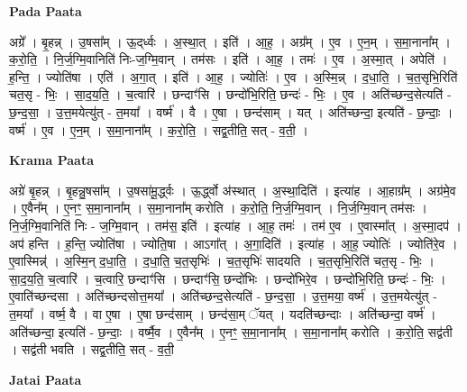 \documentclass[17pt]{extarticle}
\begin{document}
\textbf{Pada Paata} \newline

अग्रे᳚ । बृ॒हन्न् । उ॒षसा᳚म् । ऊ॒द्‌र्ध्वः । अ॒स्था॒त् । इति॑ । आ॒ह॒ । अग्र᳚म् । ए॒व । ए॒न॒म् । स॒मा॒नाना᳚म् । क॒रो॒ति॒ । नि॒र्ज॒ग्मि॒वानिति॑ निः-ज॒ग्मि॒वान् । तम॑सः । इति॑ । आ॒ह॒ । तमः॑ । ए॒व । अ॒स्मा॒त् । अपेति॑ । ह॒न्ति॒ । ज्योति॑षा । एति॑ । अ॒गा॒त् । इति॑ । आ॒ह॒ । ज्योतिः॑ । ए॒व । अ॒स्मि॒न्न् । द॒धा॒ति॒ । च॒त॒सृभि॒रिति॑ चत॒सृ - भिः॒ । सा॒द॒य॒ति॒ । च॒त्वारि॑ । छन्दाꣳ॑सि । छन्दो॑भि॒रिति॒ छन्दः॑ - भिः॒ । ए॒व । अति॑च्छन्द॒सेत्यति॑ - छ॒न्द॒सा॒ । उ॒त्त॒मयेत्यु॑त् - त॒मया᳚ । वर्ष्म॑ । वै । ए॒षा । छन्द॑साम् । यत् । अति॑च्छन्दा॒ इत्यति॑ - छ॒न्दाः॒ । वर्ष्म॑ । ए॒व । ए॒न॒म् । स॒मा॒नाना᳚म् । क॒रो॒ति॒ । सद्व॒तीति॒ सत् - व॒ती॒ ।  \newline


\textbf{Krama Paata} \newline

अग्रे॑ बृ॒हन्न् । बृ॒हन्नु॒षसा᳚म् । उ॒षसा॑मू॒र्द्ध्वः । ऊ॒र्द्ध्वो अ॑स्थात् । अ॒स्था॒दिति॑ । इत्या॑ह । आ॒हाग्र᳚म् । अग्र॑मे॒व । ए॒वैन᳚म् । 
ए॒नꣳ॒॒ स॒मा॒नाना᳚म् । स॒मा॒नाना᳚म् करोति । क॒रो॒ति॒ नि॒र्ज॒ग्मि॒वान् । नि॒र्ज॒ग्मि॒वान् तम॑सः । नि॒र्ज॒ग्मि॒वानिति॑ निः - ज॒ग्मि॒वान् । तम॑स॒ इति॑ । इत्या॑ह । आ॒ह॒ तमः॑ । तम॑ ए॒व । ए॒वास्मा᳚त् । अ॒स्मा॒दप॑ । अप॑ हन्ति । ह॒न्ति॒ ज्योति॑षा । ज्योति॒षा । आऽगा᳚त् । अ॒गा॒दिति॑ । इत्या॑ह । आ॒ह॒ ज्योतिः॑ । ज्योति॑रे॒व । ए॒वास्मिन्न्॑ । अ॒स्मि॒न् द॒धा॒ति॒ । द॒धा॒ति॒ च॒त॒सृभिः॑ । च॒त॒सृभिः॑ सादयति । च॒त॒सृभि॒रिति॑ चत॒सृ - भिः॒ । सा॒द॒य॒ति॒ च॒त्वारि॑ । च॒त्वारि॒ छन्दाꣳ॑सि । छन्दाꣳ॑सि॒ छन्दो॑भिः । छन्दो॑भिरे॒व । छन्दो॑भि॒रिति॒ छन्दः॑ - भिः॒ । ए॒वाति॑च्छन्दसा । अति॑च्छन्दसोत्त॒मया᳚ । अति॑च्छन्द॒सेत्यति॑ - छ॒न्द॒सा॒ । उ॒त्त॒मया॒ वर्ष्म॑ । उ॒त्त॒मयेत्यु॑त् - त॒मया᳚ । वर्ष्म॒ वै । वा ए॒षा । ए॒षा छन्द॑साम् । छन्द॑सा॒म् ॅयत् । यदति॑च्छन्दाः । अति॑च्छन्दा॒ वर्ष्म॑ । अति॑च्छन्दा॒ इत्यति॑ - छ॒न्दाः॒ । वर्ष्मै॒व । ए॒वैन᳚म् । ए॒नꣳ॒॒ स॒मा॒नाना᳚म् । स॒मा॒नाना᳚म् करोति । क॒रो॒ति॒ सद्व॑ती । सद्व॑ती भवति । सद्व॒तीति॒ सत् - व॒ती॒ \newline

\textbf{Jatai Paata} \newline
\end{document}
